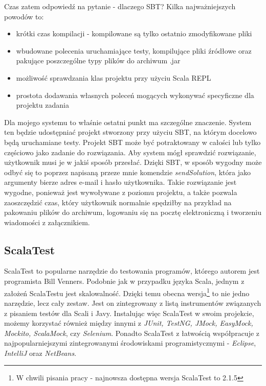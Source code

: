 \documentclass[brudnopis]{xmgr}
\begin{document}
Czas zatem odpowiedź na pytanie - dlaczego SBT? Kilka najważniejszych powodów to:
\begin{itemize}
\item krótki czas kompilacji - kompilowane są tylko ostatnio zmodyfikowane pliki
\item wbudowane polecenia uruchamiające testy, kompilujące pliki źródłowe oraz pakujące poszczególne typy plików do archiwum .jar
\item możliwość sprawdzania klas projektu przy użyciu Scala REPL
\item prostota dodawania własnych poleceń mogących wykonywać specyficzne dla projektu zadania   
\end{itemize}

Dla mojego systemu to właśnie ostatni punkt ma szczególne znaczenie. System ten będzie udostępniać projekt stworzony przy użyciu SBT, na którym docelowo będą uruchamiane testy. Projekt SBT może być potraktowany w całości lub tylko częściowo jako zadanie do rozwiązania. Aby system mógł sprawdzić rozwiązanie, użytkownik musi je w jakiś sposób przesłać. Dzięki SBT, w sposób wygodny może odbyć się to poprzez napisaną przeze mnie komendzie \emph{sendSolution}, która jako argumenty bierze adres e-mail i hasło użytkownika. Takie rozwiązanie jest wygodne, ponieważ jest wywoływane z poziomu projektu, a także pozwala zaoszczędzić czas, który użytkownik normalnie spędziłby na przykład na pakowaniu plików do archiwum, logowaniu się na pocztę elektroniczną i tworzeniu wiadomości z załącznikiem.

\subsection{ScalaTest}

\label{scalaTestSrodek} 

ScalaTest to popularne narzędzie do testowania programów, którego autorem jest programista Bill Venners. Podobnie jak w przypadku języka Scala, jednym z założeń ScalaTestu jest skalowalność. Dzięki temu obecna wersja\footnote{W chwili pisania pracy - najnowsza dostępna wersja ScalaTest to 2.1.5} to nie jedno narzędzie, lecz cały zestaw. Jest on zintegrowany z listą instrumentów związanych z pisaniem testów dla Scali i Javy. Instalując więc ScalaTest w swoim projekcie, możemy korzystać również między innymi z \textit{JUnit, TestNG, JMock, EasyMock, Mockito, ScalaMock}, czy \textit{Selenium}. Ponadto ScalaTest z łatwością współpracuje z najpopularniejszymi zintegrowanymi środowiskami programistycznymi - \textit{Eclipse}, \textit{IntelliJ} oraz \textit{NetBeans}.
\end{document}
